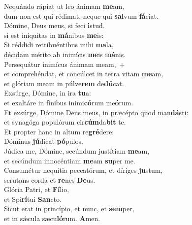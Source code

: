 \evenverse Nequándo rápiat ut leo ánimam \textbf{me}am,~\*\\
\evenverse dum non est qui rédimat, neque qui \textbf{sal}vum \textbf{fá}ciat.\\
\oddverse Dómine, Deus meus, si feci \textbf{i}stud.~\*\\
\oddverse si est iníquitas in \textbf{má}nibus \textbf{me}is:\\
\evenverse Si réddidi retribuéntibus mihi \textbf{ma}la,~\*\\
\evenverse décidam mérito ab inimícis \textbf{me}is i\textbf{ná}nis.\\
\oddverse Persequátur inimícus ánimam meam,~+\\
\oddverse  et comprehéndat, et concúlcet in terra vitam \textbf{me}am,~\*\\
\oddverse et glóriam meam in púlve\textbf{rem} de\textbf{dú}cat.\\
\evenverse Exsúrge, Dómine, in ira \textbf{tu}a:~\*\\
\evenverse et exaltáre in fínibus inimi\textbf{có}rum me\textbf{ó}rum.\\
\oddverse Et exsúrge, Dómine Deus meus, in præcépto quod man\textbf{dá}sti:~\*\\
\oddverse et synagóga populórum cir\textbf{cúm}da\textbf{bit} te.\\
\evenverse Et propter hanc in altum re\textbf{gré}dere:~\*\\
\evenverse Dóminus \textbf{jú}dicat \textbf{pó}pulos.\\
\oddverse Júdica me, Dómine, secúndum justítiam \textbf{me}am,~\*\\
\oddverse et secúndum innocéntiam \textbf{me}am \textbf{su}per me.\\
\evenverse Consumétur nequítia peccatórum, et díriges \textbf{ju}stum,~\*\\
\evenverse scrutans corda et \textbf{re}nes \textbf{De}us.\\
\oddverse Glória Patri, et \textbf{Fí}lio,~\*\\
\oddverse et Spi\textbf{rí}tui \textbf{San}cto.\\
\evenverse Sicut erat in princípio, et nunc, et \textbf{sem}per,~\*\\
\evenverse et in sǽcula sæcu\textbf{ló}rum. \textbf{A}men.\\
